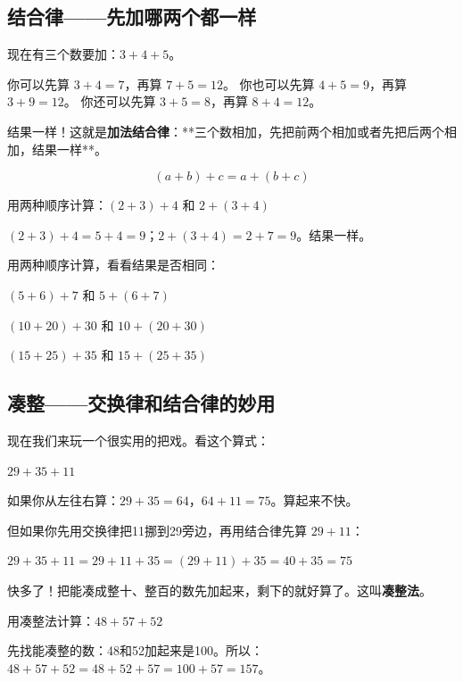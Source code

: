 \subsection*{结合律——先加哪两个都一样}

现在有三个数要加：$3+4+5$。

你可以先算 $3+4=7$，再算 $7+5=12$。
你也可以先算 $4+5=9$，再算 $3+9=12$。
你还可以先算 $3+5=8$，再算 $8+4=12$。

结果一样！这就是\textbf{加法结合律}：**三个数相加，先把前两个相加或者先把后两个相加，结果一样**。

\[
(a+b)+c = a+(b+c)
\]

\begin{example}
用两种顺序计算：$(2+3)+4$ 和 $2+(3+4)$
\end{example}
\begin{solution}
$(2+3)+4 = 5+4 = 9$；$2+(3+4) = 2+7 = 9$。结果一样。
\end{solution}

\begin{exercise}
\item 用两种顺序计算，看看结果是否相同：
  \begin{subexercise}
    \item $(5+6)+7$ 和 $5+(6+7)$
    \item $(10+20)+30$ 和 $10+(20+30)$
    \item $(15+25)+35$ 和 $15+(25+35)$
  \end{subexercise}
\end{exercise}

\subsection*{凑整——交换律和结合律的妙用}

现在我们来玩一个很实用的把戏。看这个算式：

$29+35+11$

如果你从左往右算：$29+35=64$，$64+11=75$。算起来不快。

但如果你先用交换律把11挪到29旁边，再用结合律先算 $29+11$：

$29+35+11 = 29+11+35 = (29+11)+35 = 40+35 = 75$

快多了！把能凑成整十、整百的数先加起来，剩下的就好算了。这叫\textbf{凑整法}。

\begin{example}
用凑整法计算：$48+57+52$
\end{example}
\begin{solution}
先找能凑整的数：48和52加起来是100。所以：
$48+57+52 = 48+52+57 = 100+57 = 157$。
\end{solution}

